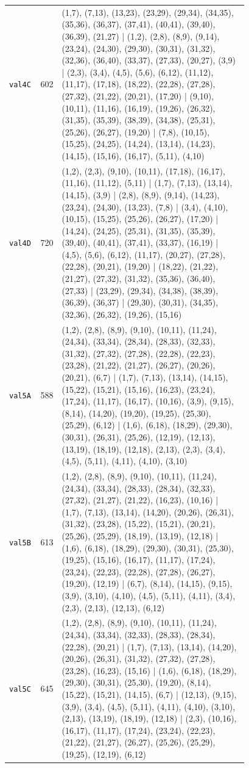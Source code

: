 \begin{landscape}
\begin{longtable}{lr>{\tiny\raggedright\arraybackslash}p{0.78\linewidth}}
\texttt{val4C} & 602 & (1,7), (7,13), (13,23), (23,29), (29,34), (34,35), (35,36), (36,37), (37,41), (40,41), (39,40), (36,39), (21,27) | (1,2), (2,8), (8,9), (9,14), (23,24), (24,30), (29,30), (30,31), (31,32), (32,36), (36,40), (33,37), (27,33), (20,27), (3,9) | (2,3), (3,4), (4,5), (5,6), (6,12), (11,12), (11,17), (17,18), (18,22), (22,28), (27,28), (27,32), (21,22), (20,21), (17,20) | (9,10), (10,11), (11,16), (16,19), (19,26), (26,32), (31,35), (35,39), (38,39), (34,38), (25,31), (25,26), (26,27), (19,20) | (7,8), (10,15), (15,25), (24,25), (14,24), (13,14), (14,23), (14,15), (15,16), (16,17), (5,11), (4,10) \\[2pt]
\texttt{val4D} & 720 & (1,2), (2,3), (9,10), (10,11), (17,18), (16,17), (11,16), (11,12), (5,11) | (1,7), (7,13), (13,14), (14,15), (3,9) | (2,8), (8,9), (9,14), (14,23), (23,24), (24,30), (13,23), (7,8) | (3,4), (4,10), (10,15), (15,25), (25,26), (26,27), (17,20) | (14,24), (24,25), (25,31), (31,35), (35,39), (39,40), (40,41), (37,41), (33,37), (16,19) | (4,5), (5,6), (6,12), (11,17), (20,27), (27,28), (22,28), (20,21), (19,20) | (18,22), (21,22), (21,27), (27,32), (31,32), (35,36), (36,40), (27,33) | (23,29), (29,34), (34,38), (38,39), (36,39), (36,37) | (29,30), (30,31), (34,35), (32,36), (26,32), (19,26), (15,16) \\[2pt]
\texttt{val5A} & 588 & (1,2), (2,8), (8,9), (9,10), (10,11), (11,24), (24,34), (33,34), (28,34), (28,33), (32,33), (31,32), (27,32), (27,28), (22,28), (22,23), (23,28), (21,22), (21,27), (26,27), (20,26), (20,21), (6,7) | (1,7), (7,13), (13,14), (14,15), (15,22), (15,21), (15,16), (16,23), (23,24), (17,24), (11,17), (16,17), (10,16), (3,9), (9,15), (8,14), (14,20), (19,20), (19,25), (25,30), (25,29), (6,12) | (1,6), (6,18), (18,29), (29,30), (30,31), (26,31), (25,26), (12,19), (12,13), (13,19), (18,19), (12,18), (2,13), (2,3), (3,4), (4,5), (5,11), (4,11), (4,10), (3,10) \\[2pt]
\texttt{val5B} & 613 & (1,2), (2,8), (8,9), (9,10), (10,11), (11,24), (24,34), (33,34), (28,33), (28,34), (32,33), (27,32), (21,27), (21,22), (16,23), (10,16) | (1,7), (7,13), (13,14), (14,20), (20,26), (26,31), (31,32), (23,28), (15,22), (15,21), (20,21), (25,26), (25,29), (18,19), (13,19), (12,18) | (1,6), (6,18), (18,29), (29,30), (30,31), (25,30), (19,25), (15,16), (16,17), (11,17), (17,24), (23,24), (22,23), (22,28), (27,28), (26,27), (19,20), (12,19) | (6,7), (8,14), (14,15), (9,15), (3,9), (3,10), (4,10), (4,5), (5,11), (4,11), (3,4), (2,3), (2,13), (12,13), (6,12) \\[2pt]
\texttt{val5C} & 645 & (1,2), (2,8), (8,9), (9,10), (10,11), (11,24), (24,34), (33,34), (32,33), (28,33), (28,34), (22,28), (20,21) | (1,7), (7,13), (13,14), (14,20), (20,26), (26,31), (31,32), (27,32), (27,28), (23,28), (16,23), (15,16) | (1,6), (6,18), (18,29), (29,30), (30,31), (25,30), (19,20), (8,14), (15,22), (15,21), (14,15), (6,7) | (12,13), (9,15), (3,9), (3,4), (4,5), (5,11), (4,11), (4,10), (3,10), (2,13), (13,19), (18,19), (12,18) | (2,3), (10,16), (16,17), (11,17), (17,24), (23,24), (22,23), (21,22), (21,27), (26,27), (25,26), (25,29), (19,25), (12,19), (6,12) \\[2pt]

\end{longtable}
\end{landscape}
